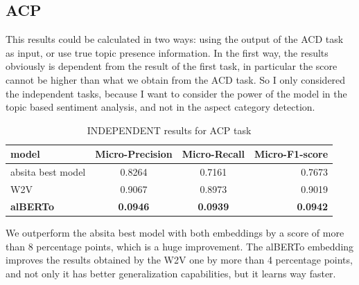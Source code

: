 \documentclass{article}
\begin{document}
            \subsection{ACP}\label{subsec:s6}
            This results could be calculated in two ways: using the output of the ACD task as input, or use true topic presence information.
                In the first way, the results obviously is dependent from the result of the first task, in particular the score cannot be higher than what we obtain from the ACD task.
                So I only considered the independent tasks, because I want to consider the power of the model in the topic based sentiment analysis, and not in the aspect category detection.
                \begin{table}[h!]
                    \begin{center}
                        \caption{INDEPENDENT results for ACP task}
                        \label{tab:table4}
                        \begin{tabular}{l|c|c|r}
                            \textbf{model} & \textbf{Micro-Precision} & \textbf{Micro-Recall} & \textbf{Micro-F1-score}\\
                            \hline
                                absita best model & 0.8264 & 0.7161 & 0.7673\\
                                W2V & 0.9067 & 0.8973 & 0.9019\\
                                \textbf{alBERTo} & \textbf{0.0946} & \textbf{0.0939} & \textbf{0.0942}\\
                        \end{tabular}
                    \end{center}
                \end{table}
            We outperform the absita best model with both embeddings by a score of more than 8 percentage points, which is a huge improvement.
            The alBERTo embedding improves the results obtained by the W2V one by more than 4 percentage points, and not only it has better generalization capabilities, but it learns way faster.
\end{document}
